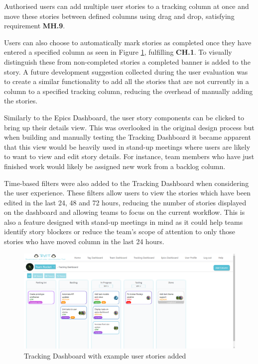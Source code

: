 \documentclass[l4proj.tex]{subfiles}
\begin{document}
Authorised users can add multiple user stories to a tracking column at once and move these stories between defined columns using drag and drop, satisfying requirement \textbf{MH.9}.

Users can also choose to automatically mark stories as completed once they have entered a specified column as seen in Figure \ref{fig:tracking dashboard}, fulfilling \textbf{CH.1}. To visually distinguish these from non-completed stories a completed banner is added to the story. A future development suggestion collected during the user evaluation was to create a similar functionality to add all the stories that are not currently in a column to a specified tracking column, reducing the overhead of manually adding the stories. 

Similarly to the Epics Dashboard, the user story components can be clicked to bring up their details view. This was overlooked in the original design process but when building and manually testing the Tracking Dashboard it became apparent that this view would be heavily used in stand-up meetings where users are likely to want to view and edit story details. For instance, team members who have just finished work would likely be assigned new work from a backlog column. 

Time-based filters were also added to the Tracking Dashboard when considering the user experience. These filters allow users to view the stories which have been edited in the last 24, 48 and 72 hours, reducing the number of stories displayed on the dashboard and allowing teams to focus on the current workflow. This is also a feature designed with stand-up meetings in mind as it could help teams identify story blockers or reduce the team's scope of attention to only those stories who have moved column in the last 24 hours.

\begin{figure}[h!]
\begin{center}
\includegraphics[scale=0.35]{dissertation/images/TrackingDashboard.png}
\caption{Tracking Dashboard with example user stories added}
\label{fig:tracking dashboard} 
\end{center}
\end{figure}
\end{document}
